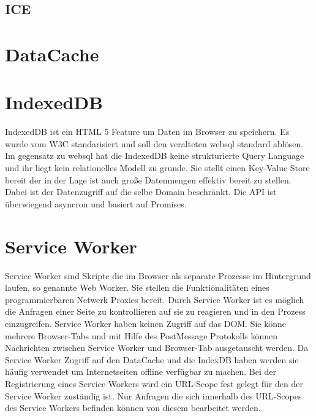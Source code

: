 %
%

\subsection{ICE}


\section{DataCache}


\section{IndexedDB}

IndexedDB ist ein HTML 5 Feature um Daten im Browser zu speichern. Es wurde vom W3C standarisiert\cite{w3IndexedDB} und soll den veralteten websql standard ablösen. Im gegensatz zu websql hat die IndexedDB keine strukturierte Query Language und ihr liegt kein relationelles Modell zu grunde. Sie stellt einen Key-Value Store bereit der in der Lage ist auch große Datenmengen effektiv bereit zu stellen. Dabei ist der Datenzugriff auf die selbe Domain beschränkt. Die API ist überwiegend asyncron und basiert auf Promises.

\section{Service Worker}
Service Worker sind Skripte die im Browser als separate Prozesse im Hintergrund laufen, so genannte Web Worker. Sie stellen die Funktionalitäten eines programmierbaren Netwerk Proxies bereit. Durch Service Worker ist es möglich die Anfragen einer Seite zu kontrollieren auf sie zu reagieren und in den Prozess einzugreifen.\cite{w3ServiceWorker} Service Worker haben keinen Zugriff auf das DOM. Sie könne mehrere Browser-Tabs und mit Hilfe des PostMessage Protokolls können Nachrichten zwischen Service Worker und Browser-Tab ausgetauscht werden. Da Service Worker Zugriff auf den DataCache und die IndexDB haben werden sie häufig verwendet um Internetseiten offline verfügbar zu machen. Bei der Registrierung eines Service Workers wird ein URL-Scope fest gelegt für den der Service Worker zuständig ist. Nur Anfragen die sich innerhalb des URL-Scopes des Service Workers befinden können von diesem bearbeitet werden.

